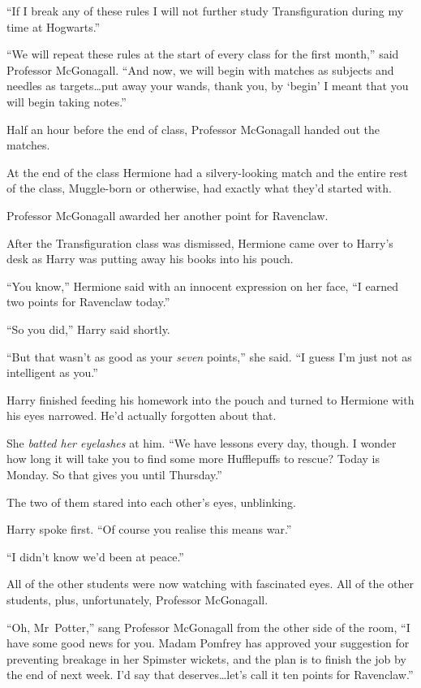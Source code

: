 “If I break any of these rules I will not further study Transfiguration during my time at Hogwarts.”

“We will repeat these rules at the start of every class for the first month,” said Professor McGonagall. “And now, we will begin with matches as subjects and needles as targets…put away your wands, thank you, by ‘begin’ I meant that you will begin taking notes.”

Half an hour before the end of class, Professor McGonagall handed out the matches.

At the end of the class Hermione had a silvery-looking match and the entire rest of the class, Muggle-born or otherwise, had exactly what they’d started with.

Professor McGonagall awarded her another point for Ravenclaw.

\later

After the Transfiguration class was dismissed, Hermione came over to Harry’s desk as Harry was putting away his books into his pouch.

“You know,” Hermione said with an innocent expression on her face, “I earned two points for Ravenclaw today.”

“So you did,” Harry said shortly.

“But that wasn’t as good as your \emph{seven} points,” she said. “I guess I’m just not as intelligent as you.”

Harry finished feeding his homework into the pouch and turned to Hermione with his eyes narrowed. He’d actually forgotten about that.

She \emph{batted her eyelashes} at him. “We have lessons every day, though. I wonder how long it will take you to find some more Hufflepuffs to rescue? Today is Monday. So that gives you until Thursday.”

The two of them stared into each other’s eyes, unblinking.

Harry spoke first. “Of course you realise this means war.”

“I didn’t know we’d been at peace.”

All of the other students were now watching with fascinated eyes. All of the other students, plus, unfortunately, Professor McGonagall.

“Oh, Mr~Potter,” sang Professor McGonagall from the other side of the room, “I have some good news for you. Madam Pomfrey has approved your suggestion for preventing breakage in her Spimster wickets, and the plan is to finish the job by the end of next week. I’d say that deserves…let’s call it ten points for Ravenclaw.”

